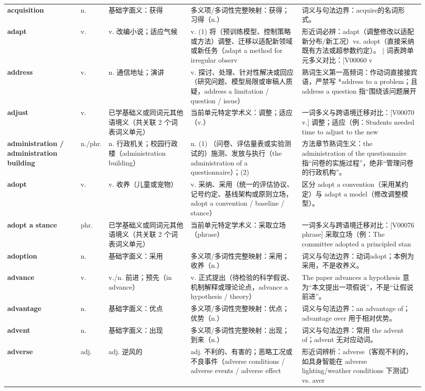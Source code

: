 \begin{longtable}{>{\raggedright\arraybackslash}p{2.5cm}>{\raggedright\arraybackslash}p{1.6cm}>{\raggedright\arraybackslash}p{3.2cm}>{\raggedright\arraybackslash}p{3.6cm}>{\raggedright\arraybackslash}p{3.3cm}}
\textbf{acquisition} & n. & 基础字面义：获得 & 多义项/多词性完整映射：获得；习得（n.） & 词义与句法边界：acquire的名词形式。 \tabularnewline
\textbf{adapt} & v. & v. 改编小说；适应气候 & v. (1)  将（预训练模型、控制策略或方法）调整、迁移以适配新领域或新任务（adapt a method for irregular observ & 形近词必辨：adapt（调整修改以适配新分布/新工况）vs. adopt（直接采纳既有方法或超参数约定）。 | 词表跨单元多义对比：[V00060 v \tabularnewline
\textbf{address} & v. & n. 通信地址；演讲 & v. 探讨、处理、针对性解决或回应（研究问题、模型局限或审稿人质疑，address a limitation / question / issue） & 熟词生义第一高频词：作动词直接接宾语，严禁写 *address to a problem；且 address a question 指“围绕该问题展开 \tabularnewline
\textbf{adjust} & v. & 已学基础义或同词元其他语境义（共关联 2 个词表词义单元） & 当前单元特定学术义：调整；适应（v.） & 一词多义与跨语境迁移对比：[V00070 v.] 调整；适应（例：Students needed time to adjust to the new  \tabularnewline
\textbf{administration / administration building} & n./phr. & n. 行政机关；校园行政楼（administration building） & n. (1) （问卷、评估量表或实验测试的）施测、发放与执行（the administration of a questionnaire）；(2)   & 方法章节熟词生义：the administration of the questionnaire 指“问卷的实施过程”，绝非“管理问卷的行政机构”。 \tabularnewline
\textbf{adopt} & v. & v. 收养（儿童或宠物） & v. 采纳、采用（统一的评估协议、记号约定、基线架构或原则立场，adopt a convention / baseline / stance） & 区分 adopt a convention（采用某约定）与 adapt a model（修改调整模型）。 \tabularnewline
\textbf{adopt a stance} & phr. & 已学基础义或同词元其他语境义（共关联 2 个词表词义单元） & 当前单元特定学术义：采取立场（phrase） & 一词多义与跨语境迁移对比：[V00076 phrase] 采取立场（例：The committee adopted a principled stan \tabularnewline
\textbf{adoption} & n. & 基础字面义：采用 & 多义项/多词性完整映射：采用；收养（n.） & 词义与句法边界：动词adopt；本例为采用，不是收养义。 \tabularnewline
\textbf{advance} & v. & v./n. 前进；预先（in advance） & v. 正式提出（待检验的科学假说、机制解释或理论论点，advance a hypothesis / theory） & The paper advances a hypothesis 意为“本文提出一项假说”，不是“让假说前进”。 \tabularnewline
\textbf{advantage} & n. & 基础字面义：优点 & 多义项/多词性完整映射：优点；优势（n.） & 词义与句法边界：an advantage of；advantage over 用于相对优势。 \tabularnewline
\textbf{advent} & n. & 基础字面义：出现 & 多义项/多词性完整映射：出现；到来（n.） & 词义与句法边界：常用 the advent of；advent 无对应动词。 \tabularnewline
\textbf{adverse} & adj. & adj. 逆风的 & adj. 不利的、有害的；恶略工况或不良事件（adverse conditions / adverse events / adverse effect & 形近词辨析：adverse（客观不利的，如具身智能在 adverse lighting/weather conditions 下测试）vs. aver \tabularnewline

\end{longtable}
